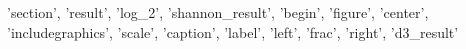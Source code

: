 {'section', 'result', 'log_2', 'shannon_result', 'begin', 'figure', 'center', 'includegraphics', 'scale', 'caption', 'label', 'left', 'frac', 'right', 'd3_result'}
